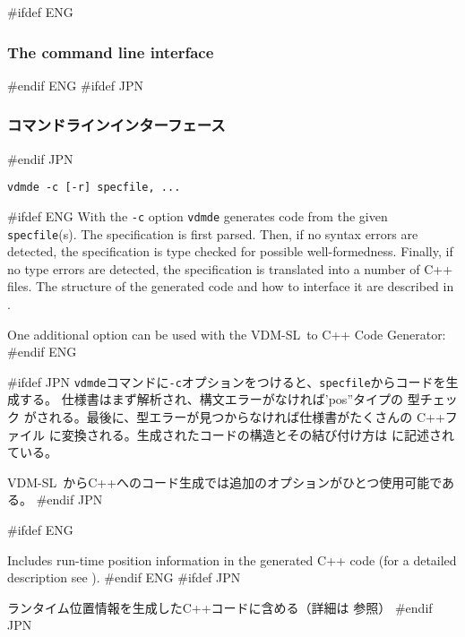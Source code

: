 \documentclass[\pformat,12pt]{article}
\newcommand{\vdmslpp}{VDM-SL}
\newcommand{\vdmde}{vdmde}
\newcommand{\vdmslpp}{VDM++}
\newcommand{\vdmde}{vppde}
\begin{document}
#ifdef ENG
\subsubsection{The command line interface}
#endif ENG
#ifdef JPN
\subsubsection{コマンドラインインターフェース}
#endif JPN

{\tt \vdmde\ -c [-r] specfile, ...}

#ifdef ENG
With the {\tt -c} option {\tt \vdmde} generates code from the given
{\tt specfile}(s). The specification is first parsed. Then, if no syntax
errors are detected, the specification is type checked for possible
well-formedness. Finally, if no type
errors are detected, the specification is translated into a number of
C++ files. The structure of the generated code and
how to interface it are described in
.

One additional option can be used with the \vdmslpp\ to C++ Code
Generator:
#endif ENG

#ifdef JPN
{\tt vdmde}コマンドに{\tt -c}オプションをつけると、{\tt specfile}からコードを生成する。
仕様書はまず解析され、構文エラーがなければ'pos''タイプの
型チェック がされる。最後に、型エラーが見つからなければ仕様書がたくさんの
C++ファイル に変換される。生成されたコードの構造とその結び付け方は
に記述されている。

\vdmslpp\ からC++へのコード生成では追加のオプションがひとつ使用可能である。
#endif JPN

\begin{description}
#ifdef ENG
\item[{\tt -r}] Includes run-time position information in the
  generated C++ code (for a detailed description see
  ).
#endif ENG
#ifdef JPN
\item[{\tt -r}]
  ランタイム位置情報を生成したC++コードに含める（詳細は
  参照）
#endif JPN
\end{description}
\end{document}
